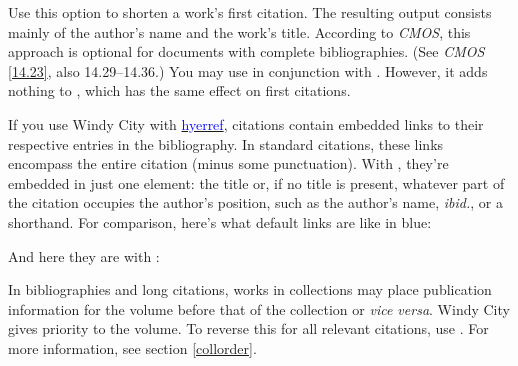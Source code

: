 \documentclass[11pt,letterpaper,oneside]{article}
\begin{document}
\begin{optionlist}

\noindent Use this option to shorten a work's first citation. The
resulting output consists mainly of the author's name and the work's
title. According to \textit{CMOS}, this approach is optional for
documents with complete bibliographies. (See \textit{CMOS}
\ref{14.23}, also 14.29--14.36.) You may use  in
conjunction with . However, it adds nothing to ,
which has the same effect on first citations.


\noindent If you use Windy City with
\href{http://www.ctan.org/pkg/hyperref}{\textcolor{blue}{hyerref}},
citations contain embedded links to their respective entries in the
bibliography. In standard citations, these links encompass the entire
citation (minus some punctuation). With , they're
embedded in just one element: the title or, if no title is present,
whatever part of the citation occupies the author's position, such as
the author's name, \textit{ibid.}, or a shorthand. For comparison,
here's what default links are like in blue:

\hypersetup{citecolor=blue}
\begin{citeonly}
\item \cite[24--25]{morley1995}
\item \cite{schwartz1992}
\item \cite{kaiser1964}
\item \cite[43]{morley1995}
\item \cite[138]{schwartz1992}
\item \cite[189--90]{kaiser1964}
\end{citeonly}

\noindent And here they are with :

\begin{citeonly}
\item \cite[24--25]{morley1995}
\item \cite{schwartz1992}
\item \cite{kaiser1964}
\item \cite[43]{morley1995}
\item \cite[138]{schwartz1992}
\item \cite[189--90]{kaiser1964}
\end{citeonly}
\hypersetup{citecolor=}


\noindent In bibliographies and long citations, works in collections
may place publication information for the volume before that of the
collection or \textit{vice versa}. Windy City gives priority to the
volume. To reverse this for all relevant citations, use .
For more information, see section \ref{collorder}.

\end{optionlist}
\end{document}
